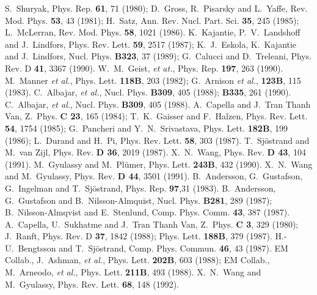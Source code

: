\begin{thebibliography}{99}

 S.~Shuryak, Phys. Rep. {\bf 61}, 71 (1980); D.~Gross, 
        R.~Pisarsky and L.~Yaffe, Rev. Mod. Phys. {\bf 53}, 43 (1981);
        H.~Satz, Ann. Rev. Nucl. Part. Sci. {\bf 35}, 245 (1985);
        L.~McLerran, Rev. Mod. Phys. {\bf 58}, 1021 (1986).
 K.~Kajantie, P.~V.~Landshoff and J.~Lindfors, Phys. Rev. Lett.
        {\bf 59}, 2517 (1987); K.~J.~Eskola, K.~Kajantie and J.~Lindfors,
        Nucl. Phys. {\bf B323}, 37 (1989); G.~Calucci and D.~Treleani,
        Phys. Rev. D {\bf 41}, 3367 (1990).
 W.~M.~Geist, {\em et at.}, Phys. Rep. {\bf 197}, 263 (1990).
 M.~Manner {\em et al.}, Phys. Lett. {\bf 118B}, 203 (1982);
        G.~Arnison {\em et al.}, {\bf 123B}, 115 (1983).
 C.~Albajar, {\em et al.}, Nucl. Phys. {\bf B309}, 
        405 (1988); {\bf B335}, 261 (1990).
 C.~Albajar, {\em et al.}, Nucl. Phys. {\bf B309},
                405 (1988).
 A.~Capella and J.~Tran Thanh Van, Z.~Phys. {\bf C 23},
        165 (1984);  T.~K.~Gaisser and F.~Halzen, Phys. Rev. Lett. {\bf 54},
        1754 (1985); G.~Pancheri and Y.~N.~Srivastava, Phys. Lett. {\bf 182B},
        199 (1986); L.~Durand and H.~Pi, Phys. Rev. Lett. {\bf 58}, 303 (1987).
 T.~Sj\"{o}strand and M.~van Zijl, Phys. Rev. {\bf D 36},
        2019 (1987).
X.~N.~Wang, Phys. Rev. {\bf D 43}, 104 (1991).
 M.~Gyulassy and M.~Pl\"{u}mer, Phys. Lett. {\bf 243B}, 
        432 (1990).
 X.~N.~Wang and M.~Gyulassy, Phys. Rev. {\bf D 44}, 
        3501 (1991).
 B.~Andersson, G.~Gustafson, G.~Ingelman and T.~Sj\"{o}strand,
        Phys. Rep. {\bf 97},31 (1983).
 B.~Andersson, G.~Gustafson and B.~Nilsson-Almquist,
        Nucl. Phys. {\bf B281}, 289 (1987); B.~Nilsson-Almqvist and
        E.~Stenlund, Comp. Phys. Comm. {\bf 43}, 387 (1987).
 A.~Capella, U.~Sukhatme and J.~Tran Thanh Van, Z.~Phys.
        {\bf C 3}, 329 (1980); J.~Ranft, Phys. Rev. D {\bf 37}, 1842 (1988); 
        Phys. Lett. {\bf 188B}, 379 (1987).
 H.-U.~Bengtsson and T.~Sj\"{o}strand, 
        Comp. Phys. Commun. {\bf 46}, 43 (1987).
 EM Collab., J.~Ashman, {\em et al.}, Phys. Lett. {\bf 202B},
        603 (1988); EM Collab., M.~Arneodo, {\em et al.}, Phys. Lett.
        {\bf 211B}, 493 (1988).
 X.~N.~Wang and M.~Gyulassy, Phys. Rev. Lett. {\bf 68},
        148 (1992).

\end{thebibliography}

